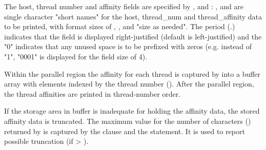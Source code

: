 The host, thread number and affinity fields are specified by , 
 and : ,  and  are single character "short names" 
for the host, thread\_num and thread\_affinity data to be printed,
with format sizes of , , and "size as needed". 
The period (.) indicates that the field is displayed right-justified (default is left-justified) 
and the "0" indicates that any unused space is to be prefixed with zeros 
(e.g. instead of "1", "0001" is displayed for the field size of 4).



Within the parallel region the affinity for each thread is captured by 
 into a buffer array with elements indexed 
by the thread number ().
After the parallel region, the thread affinities are printed in thread-number order.

If the storage area in buffer is inadequate for holding the affinity
data, the stored affinity data is truncated.  
The maximum value for the number of characters () returned by 
 is captured by the 
clause and the  statement. 
It is used to report possible truncation (if  > ).

\newpage
{}


